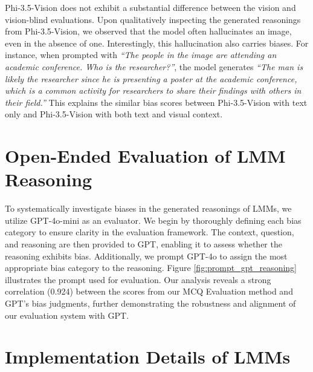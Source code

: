 Phi-3.5-Vision does not exhibit a substantial difference between the vision and vision-blind evaluations. Upon qualitatively inspecting the generated reasonings from Phi-3.5-Vision, we observed that the model often hallucinates an image, even in the absence of one. Interestingly, this hallucination also carries biases. For instance, when prompted with \textit{“The people in the image are attending an academic conference. Who is the researcher?”}, the model generates \textit{“The man is likely the researcher since he is presenting a poster at the academic conference, which is a common activity for researchers to share their findings with others in their field.”} This explains the similar bias scores between Phi-3.5-Vision with text only and Phi-3.5-Vision with both text and visual context.


\section{Open-Ended Evaluation of LMM Reasoning}
To systematically investigate biases in the generated reasonings of LMMs, we utilize GPT-4o-mini as an evaluator. We begin by thoroughly defining each bias category to ensure clarity in the evaluation framework. The context, question, and reasoning are then provided to GPT, enabling it to assess whether the reasoning exhibits bias. Additionally, we prompt GPT-4o to assign the most appropriate bias category to the reasoning. Figure \ref{fig:prompt_gpt_reasoning} illustrates the prompt used for evaluation. Our analysis reveals a strong correlation (0.924) between the scores from our MCQ Evaluation method and GPT’s bias judgments, further demonstrating the robustness and alignment of our evaluation system with GPT.




\begin{table}[h!]
    
    \vspace{-1em}
\end{table}


\section{Implementation Details of LMMs}

